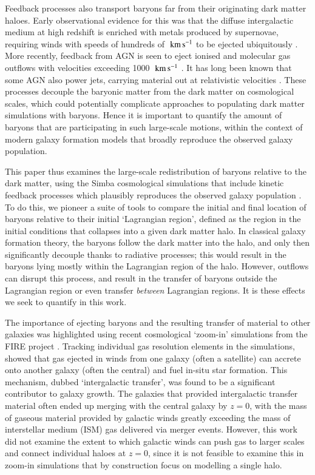 \documentclass[fleqn,usenatbib]{mnras}
\newcommand{\kms}{\;{\rm km}\,{\rm s}^{-1}}
\newcommand{\simba}{{\sc Simba}}
\begin{document}
Feedback processes also transport baryons far from their originating dark
matter haloes. Early observational evidence for this was that the diffuse
intergalactic medium at high redshift is enriched with metals produced by
supernovae, requiring winds with speeds of hundreds of $\kms{}$ to be ejected
ubiquitously \citep[e.g.][]{Aguirre2001, Springel2003, Oppenheimer2006}. More
recently, feedback from AGN is seen to eject ionised and molecular gas
outflows with velocities exceeding 1000 $\kms{}$
\citep[e.g.][]{Sturm2001, Greene2012, Maiolino2012, Zakamska2016}. It has
long been known that some AGN also power jets, carrying material out at
relativistic velocities \citep{Fabian2012}. These processes decouple the
baryonic matter from the dark matter on cosmological scales, which could
potentially complicate approaches to populating dark matter simulations with
baryons. Hence it is important to quantify the amount of baryons that are
participating in such large-scale motions, within the context of modern
galaxy formation models that broadly reproduce the observed galaxy
population.

This paper thus examines the large-scale redistribution of baryons relative to the
dark matter, using the \simba{} cosmological simulations that include kinetic
feedback processes which plausibly reproduces the observed galaxy population
\citep{Dave2019}. To do this, we pioneer a suite of tools to compare the
initial and final location of baryons relative to their initial `Lagrangian
region', defined as the region in the initial conditions that collapses into
a given dark matter halo. In classical galaxy formation theory, the baryons
follow the dark matter into the halo, and only then significantly decouple
thanks to radiative processes; this would result in the baryons lying mostly
within the Lagrangian region of the halo. However, outflows can disrupt this
process, and result in the transfer of baryons outside the Lagrangian region
or even transfer \emph{between} Lagrangian regions. It is these effects we
seek to quantify in this work.

The importance of ejecting baryons and the resulting transfer of material to
other galaxies was highlighted using recent cosmological `zoom-in'
simulations from the FIRE project \citep{Hopkins2014,Hopkins2018}. Tracking
individual gas resolution elements in the simulations,
\citet{AnglesAlcazar2017} showed that gas ejected in winds from one galaxy
(often a satellite) can accrete onto another galaxy (often the central) and
fuel in-situ star formation. This mechanism, dubbed `intergalactic transfer',
was found to be a significant contributor to galaxy growth. The galaxies that
provided intergalactic transfer material often ended up merging with the
central galaxy by $z=0$, with the mass of gaseous material provided by
galactic winds greatly exceeding the mass of interstellar medium (ISM) gas
delivered via merger events. However, this work did not examine the extent to
which galactic winds can push gas to larger scales and connect individual
haloes at $z=0$, since it is not feasible to examine this in zoom-in
simulations that by construction focus on modelling a single halo.
\end{document}

